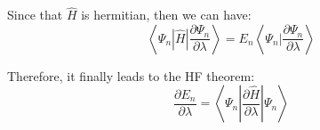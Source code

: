 Since that $\hat{H}$ is hermitian, then we can have:
\begin{equation}\label{}
\left\langle\Psi_{n}|\hat{H}|\frac{\partial \Psi_{n}}{\partial
\lambda}\right\rangle = E_{n}\left\langle\Psi_{n}|\frac{\partial
\Psi_{n}}{\partial \lambda}\right\rangle
\end{equation}

Therefore, it finally leads to the HF theorem:
\begin{equation}\label{}
\frac{\partial E_{n}}{\partial \lambda} =
\left\langle\Psi_{n}|\frac{\partial \hat{H}}{\partial
\lambda}|\Psi_{n}\right\rangle
\end{equation}







